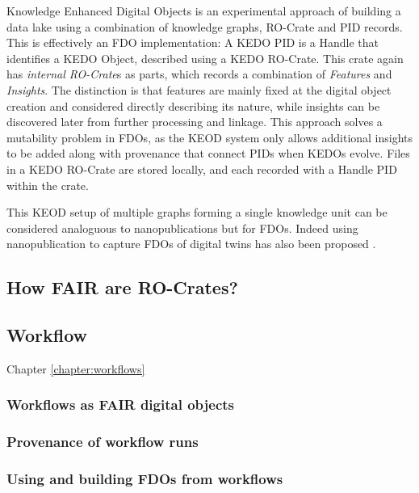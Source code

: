 Knowledge Enhanced Digital Objects  \cite{Luo 2022} is an experimental approach of building a data lake using a combination of knowledge graphs, RO-Crate and PID records\cite{Luo 2023}. This is effectively an FDO implementation: A KEDO PID is a Handle that identifies a KEDO Object, described using a KEDO RO-Crate. This crate again has \emph{internal RO-Crate}s as parts, which records a combination of \emph{Features} and \emph{Insights}. The distinction is that features are mainly fixed at the digital object creation and considered directly describing its nature, while insights can be discovered later from further processing and linkage. This approach solves a mutability problem in FDOs, as the KEOD system only allows additional insights to be added along with provenance that connect PIDs when KEDOs evolve. Files in a KEDO RO-Crate are stored locally, and each recorded with a Handle PID within the crate.

This KEOD setup of multiple graphs forming a single knowledge unit can be considered analoguous to nanopublications \cite{Kuhn 2021} but for FDOs. Indeed using nanopublication to capture FDOs of digital twins has also been proposed  \cite{10.3389/data.2022.883341}.


\subsection{How FAIR are RO-Crates?}

\cite{FAIROs}


\subsection{Workflow}

Chapter \vref{chapter:workflows} 

\subsubsection{Workflows as FAIR digital objects}



\subsubsection{Provenance of workflow runs}

\cite{workflow-run-crate}


\subsubsection{Using and building FDOs from workflows}


